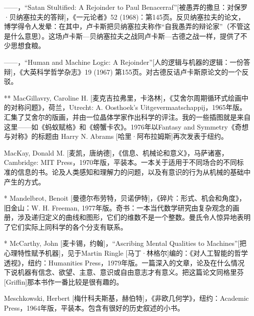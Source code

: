 \begin{thebib}
\begin{biblist}
\item ——，“Satan Stultified: A Rejoinder to Paul Benacerraf”[被愚弄的撒旦：对保罗·贝纳塞拉夫的答辩]，《一元论者》52 (1968)：第145页。反贝纳塞拉夫的论文，博学得令人发晕：在其中，卢卡斯把贝纳塞拉夫称作“自我愚弄的辩论家”（不管这是什么意思）。这场卢卡斯—贝纳塞拉夫之战同卢卡斯—古德之战一样，提供了不少思想食粮。

\item ——，“Human and Machine Logic: A Rejoinder”[人的逻辑与机器的逻辑：一份答辩]，《大英科学哲学杂志》19 (1967) 第155页。对古德反诘卢卡斯原论文的一个反驳。

\item[**] MacGillavry, Caroline H. [麦克吉拉弗里，卡洛林]，《艾舍尔周期循环式绘画中的对称问题》，荷兰，Utrecht: A. Oosthoek's Uitgevermaatschappij，1965年版。汇集了艾舍尔的版画，并由一位晶体学家作出科学的评注。我的一些插图就是来自这里——如《蚂蚁赋格》和《螃蟹卡农》。1976年以Fantasy and Symmetry《奇想与对称》的标题由 Harry N. Abrams [哈里·阿布拉姆斯]再次发表于纽约。

\item MacKay, Donald M. [麦凯，唐纳德]，《信息、机械论和意义》，马萨诸塞，Cambridge: MIT Press，1970年版，平装本。一本关于适用于不同场合的不同标准的信息的书。论及人类感知和理解力的问题，以及有意识的行为从机械的基础中产生的方式。

\item[*] Mandelbrot, Benoit [曼德尔布劳特，贝诺伊特]，《碎片：形式、机会和角度》，旧金山：W. H. Freeman, 1977年版。奇书：一本当代数学研究由复杂观念的画册，涉及递归定义的曲线和图形，它们的维数不是一个整数。曼氏令人惊异地表明了它们实际上同科学的各个分支有联系。

\item[*] McCarthy, John [麦卡锡，约翰]，“Ascribing Mental Qualities to Machines”[把心理特性赋予机器]，见于Martin Ringle [马丁·林格尔]编的：《对人工智能的哲学透视》，纽约：Humanities Press，1979年版。一篇深入的文章，论及在什么情况下说机器有信念、欲望、主意、意识或自由意志才有意义。把这篇论文同格里芬[Griffin]那本书作一番比较是很有趣的。

\item Meschkowski, Herbert [梅什科夫斯基，赫伯特]，《非欧几何学》，纽约：Academic Press，1964年版，平装本。包含有很好的历史叙述的小书。


\end{biblist}
\end{thebib}
